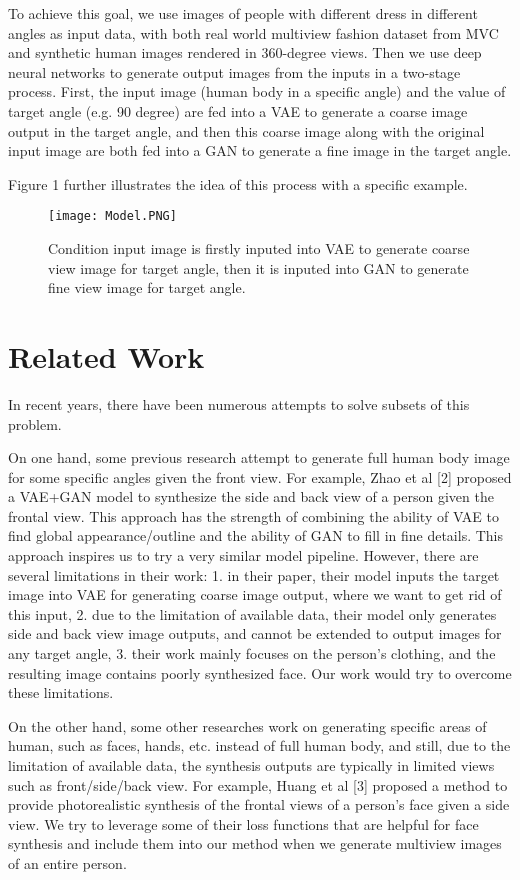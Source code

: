 \documentclass[10pt,conference]{IEEEtran}
\begin{document}
To achieve this goal, we use images of people with different dress in different angles as input data, with both real world multiview fashion dataset from MVC \autocite{liu2016mvc} and synthetic human images rendered in 360-degree views. Then we use deep neural networks to generate output images from the inputs in a two-stage process. First, the input image (human body in a specific angle) and the value of target angle (e.g. 90 degree) are fed into a VAE to generate a coarse image output in the target angle, and then this coarse image along with the original input image are both fed into a GAN to generate a fine image in the target angle.

Figure 1 further illustrates the idea of this process with a specific example.

\begin{figure}[htbp]
\centering
\texttt{[image: Model.PNG]}
\caption{Condition input image is firstly inputed into VAE to generate coarse view image for target angle, then it is inputed into GAN to generate fine view image for target angle.}
\end{figure}


\section{Related Work}
In recent years, there have been numerous attempts to solve subsets of this problem. 

On one hand, some previous research attempt to generate full human body image for some specific angles given the front view. For example, Zhao et al [2] proposed a VAE+GAN model to synthesize the side and back view of a person given the frontal view. This approach has the strength of combining the ability of VAE to find global appearance/outline and the ability of GAN to fill in fine details. This approach inspires us to try a very similar model pipeline. However, there are several limitations in their work: 1. in their paper, their model inputs the target image into VAE for generating coarse image output, where we want to get rid of this input, 2. due to the limitation of available data, their model only generates side and back view image outputs, and cannot be extended to output images for any target angle, 3. their work mainly focuses on the person’s clothing, and the resulting image contains poorly synthesized face. Our work would try to overcome these limitations.

On the other hand, some other researches work on generating specific areas of human, such as faces, hands, etc. instead of full human body, and still, due to the limitation of available data, the synthesis outputs are typically in limited views such as front/side/back view. For example, Huang et al [3] proposed a method to provide photorealistic synthesis of the frontal views of a person’s face given a side view. We try to leverage some of their loss functions that are helpful for face synthesis and include them into our method when we generate multiview images of an entire person.
\end{document}
